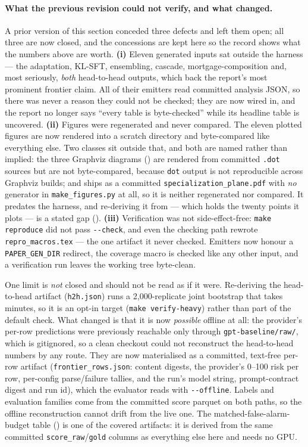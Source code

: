\documentclass[11pt]{article}
\newcommand{\code}[1]{\texttt{\small #1}}
\begin{document}
\paragraph{What the previous revision could not verify, and what changed.} A prior version of this
section conceded three defects and left them open; all three are now closed, and the concessions are
kept here so the record shows what the numbers above are worth. \textbf{(i)} Eleven generated inputs sat
outside the harness --- the adaptation, KL-SFT, ensembling, cascade, mortgage-composition and, most
seriously, \emph{both} head-to-head outputs, which back the report's most prominent frontier claim. All
of their emitters read committed analysis JSON, so there was never a reason they could not be checked;
they are now wired in, and the report no longer says ``every table is byte-checked'' while its headline
table is uncovered. \textbf{(ii)} Figures were regenerated and never compared. The eleven plotted
figures are now rendered into a scratch directory and byte-compared like everything else. Two classes
sit outside that, and both are named rather than implied: the three Graphviz diagrams
() are rendered from committed \code{.dot} sources but are not
byte-compared, because \code{dot} output is not reproducible across Graphviz builds; and
 ships as a committed \code{specialization\_plane.pdf} with \emph{no} generator in
\code{make\_figures.py} at all, so it is neither regenerated nor compared. It predates the harness, and
re-deriving it from  --- which holds the twenty points it plots --- is a stated
gap (). \textbf{(iii)} Verification was not
side-effect-free: \code{make reproduce} did not pass \code{-{}-check}, and even the checking path
rewrote \code{repro\_macros.tex} --- the one artifact it never checked. Emitters now honour a
\code{PAPER\_GEN\_DIR} redirect, the coverage macro is checked like any other input, and a verification
run leaves the working tree byte-clean.

One limit is \emph{not} closed and should not be read as if it were. Re-deriving the head-to-head
artifact (\code{h2h.json}) runs a 2{,}000-replicate joint bootstrap that takes
minutes, so it is an opt-in target (\code{make verify-heavy}) rather than part of the default check.
What changed is that it is now \emph{possible} offline at all: the provider's per-row predictions were
previously reachable only through \code{gpt-baseline/raw/}, which is gitignored, so a clean checkout
could not reconstruct the head-to-head numbers by any route. They are now materialised as a committed,
text-free per-row artifact (\code{frontier\_rows.json}: content digests, the provider's 0--100 risk per
row, per-config parse/failure tallies, and the run's model string, prompt-contract digest and run id),
which the evaluator reads with \code{-{}-offline}. Labels and evaluation families come from the
committed score parquet on both paths, so the offline reconstruction cannot drift from the live one.
The matched-false-alarm-budget table () is one of the covered artifacts: it is
derived from the same committed \code{score\_raw}/\code{gold} columns as everything else here and needs
no GPU.
\end{document}
